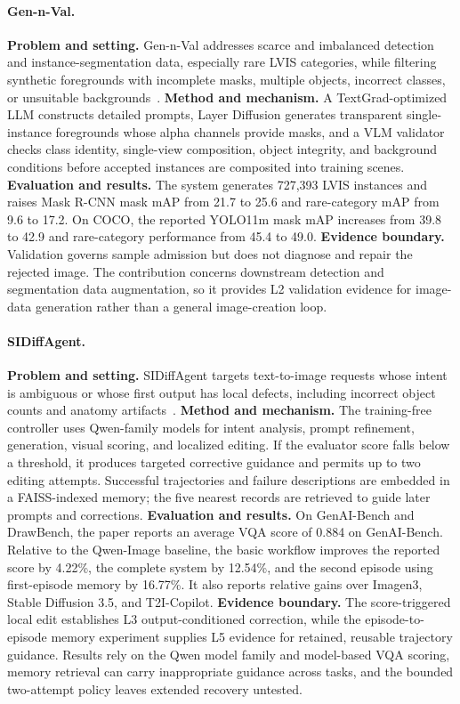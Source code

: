 \paragraph{Gen-n-Val.}
\textbf{Problem and setting.} Gen-n-Val addresses scarce and imbalanced detection and instance-segmentation data, especially rare LVIS categories, while filtering synthetic foregrounds with incomplete masks, multiple objects, incorrect classes, or unsuitable backgrounds~\cite{huang2025gennval}. \textbf{Method and mechanism.} A TextGrad-optimized LLM constructs detailed prompts, Layer Diffusion generates transparent single-instance foregrounds whose alpha channels provide masks, and a VLM validator checks class identity, single-view composition, object integrity, and background conditions before accepted instances are composited into training scenes. \textbf{Evaluation and results.} The system generates 727,393 LVIS instances and raises Mask R-CNN mask mAP from 21.7 to 25.6 and rare-category mAP from 9.6 to 17.2. On COCO, the reported YOLO11m mask mAP increases from 39.8 to 42.9 and rare-category performance from 45.4 to 49.0. \textbf{Evidence boundary.} Validation governs sample admission but does not diagnose and repair the rejected image. The contribution concerns downstream detection and segmentation data augmentation, so it provides L2 validation evidence for image-data generation rather than a general image-creation loop.

\paragraph{SIDiffAgent.}
\textbf{Problem and setting.} SIDiffAgent targets text-to-image requests whose intent is ambiguous or whose first output has local defects, including incorrect object counts and anatomy artifacts~\cite{avg260202051}. \textbf{Method and mechanism.} The training-free controller uses Qwen-family models for intent analysis, prompt refinement, generation, visual scoring, and localized editing. If the evaluator score falls below a threshold, it produces targeted corrective guidance and permits up to two editing attempts. Successful trajectories and failure descriptions are embedded in a FAISS-indexed memory; the five nearest records are retrieved to guide later prompts and corrections. \textbf{Evaluation and results.} On GenAI-Bench and DrawBench, the paper reports an average VQA score of 0.884 on GenAI-Bench. Relative to the Qwen-Image baseline, the basic workflow improves the reported score by 4.22\%, the complete system by 12.54\%, and the second episode using first-episode memory by 16.77\%. It also reports relative gains over Imagen3, Stable Diffusion 3.5, and T2I-Copilot. \textbf{Evidence boundary.} The score-triggered local edit establishes L3 output-conditioned correction, while the episode-to-episode memory experiment supplies L5 evidence for retained, reusable trajectory guidance. Results rely on the Qwen model family and model-based VQA scoring, memory retrieval can carry inappropriate guidance across tasks, and the bounded two-attempt policy leaves extended recovery untested.



